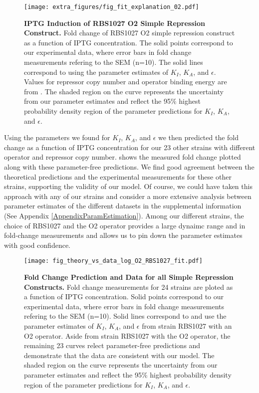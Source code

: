 \begin{figure}[h]
	\centering \texttt{[image: extra\_figures/fig\_fit\_explanation\_02.pdf]}
	\caption{{\bf IPTG Induction of RBS1027 O2 Simple Repression Construct.} Fold change of RBS1027 O2 simple repression construct as a function of IPTG concentration. The solid points correspond to our experimental data, where error bars in fold change measurements refering to the SEM (n=10). The solid lines correspond to \eref[eq7] using the parameter estimates of $K_I$, $K_A$, and $\epsilon$. Values for repressor copy number and operator binding energy are from \cite{Garcia2011}.  The shaded region on the curve represents the uncertainty from our parameter estimates and reflect the 95\% highest probability density region of the parameter predictions for $K_I$, $K_A$, and $\epsilon$.}
	\label{fig_result1}
\end{figure}

Using the parameters we found for $K_I$, $K_A$, and $\epsilon$ we then predicted the fold change as a function of IPTG concentration for our 23 other strains with different operator and repressor copy number.  shows the measured fold change plotted along with these parameter-free predictions. We find good agreement between the theoretical predictions and the experimental measurements for these other strains, supporting the validity of our model. Of course, we could have taken this approach with any of our strains and  consider a more extensive analysis between parameter estimates of the different datasets in the supplemental information (See Appendix \ref{AppendixParamEstimation}). Among our different strains, the choice of RBS1027 and the O2 operator provides a large dynaimc range and in fold-change measurements and allows us to pin down the parameter estimates with good confidence. 

\begin{figure}[h]
	\centering \texttt{[image: fig\_theory\_vs\_data\_log\_O2\_RBS1027\_fit.pdf]}
	\caption{{\bf Fold Change Prediction and Data for all Simple Repression Constructs.}  Fold change measurements for 24 strains are ploted as a function of IPTG concentration. Solid points correspond to our experimental data, where error bars in fold change measurements refering to the SEM (n=10). Solid lines correspond to \eref[eq7] and use the parameter estimates of $K_I$, $K_A$, and $\epsilon$ from strain RBS1027 with an O2 operator. Aside from strain RBS1027 with the O2 operator, the remaining 23 curves relect parameter-free predictions and demonstrate that the data are consistent with our model. The shaded region on the curve represents the uncertainty from our parameter estimates and reflect the 95\% highest probability density region of the parameter predictions for $K_I$, $K_A$, and $\epsilon$.}
	\label{fig_result2}
\end{figure}

